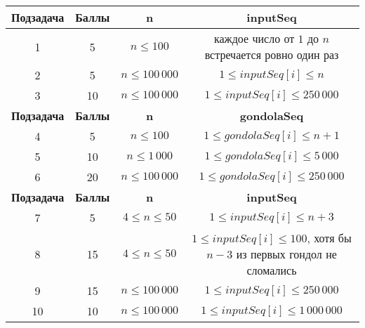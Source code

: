 \begin{center}
\renewcommand{\arraystretch}{1.5}
\begin{tabular}{|c|c|c|c|}
\hline
\textbf{Подзадача} & \textbf{Баллы} &  \textbf{n} & \textbf{inputSeq} \\
\hline
1 &  5 & $n \le 100$ & каждое число от $1$ до $n$ встречается ровно один раз\\
\hline
2 & 5 &  $n \le 100\,000$ & $1 \le inputSeq[i] \le n$ \\
\hline
3 & 10 & $n \le 100\,000$ & $1 \le inputSeq[i] \le 250\,000$ \\
\hline
\textbf{Подзадача} & \textbf{Баллы} &  \textbf{n} & \textbf{gondolaSeq} \\
\hline
4 & 5 & $n \le 100$ & $1 \le gondolaSeq[i] \le n + 1$ \\
\hline
5 & 10 & $n \le 1\,000$ & $1 \le gondolaSeq[i] \le 5\,000$ \\
\hline
6 & 20 & $n \le 100\,000$ & $1 \le gondolaSeq[i] \le 250\,000$\\
\hline
\textbf{Подзадача} & \textbf{Баллы} &  \textbf{n} & \textbf{inputSeq} \\
\hline
7 & 5 & $4 \le n \le 50$ & $1 \le inputSeq[i] \le n + 3$\\
\hline
8 & 15 & $4 \le n \le 50$ & $1 \le inputSeq[i] \le 100$, хотя бы $n - 3$ из первых
гондол не сломались \\
\hline
9 & 15 & $n \le 100\,000$ & $1 \le inputSeq[i] \le 250\,000$ \\
\hline
10 & 10 & $n \le 100\,000$ & $1 \le inputSeq[i] \le 1\,000\,000$ \\
\hline
\end{tabular}
\end{center}